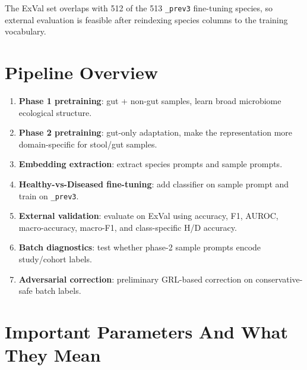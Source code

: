 \documentclass[11pt]{article}
\newcommand{\code}[1]{\texttt{\small #1}}
\begin{document}
The ExVal set overlaps with 512 of the 513 \code{\_prev3} fine-tuning species, so external
evaluation is feasible after reindexing species columns to the training vocabulary.

\section{Pipeline Overview}

\begin{enumerate}
  \item \textbf{Phase 1 pretraining}: gut + non-gut samples, learn broad microbiome
  ecological structure.
  \item \textbf{Phase 2 pretraining}: gut-only adaptation, make the representation more
  domain-specific for stool/gut samples.
  \item \textbf{Embedding extraction}: extract species prompts and sample prompts.
  \item \textbf{Healthy-vs-Diseased fine-tuning}: add classifier on sample prompt and train
  on \code{\_prev3}.
  \item \textbf{External validation}: evaluate on ExVal using accuracy, F1, AUROC,
  macro-accuracy, macro-F1, and class-specific H/D accuracy.
  \item \textbf{Batch diagnostics}: test whether phase-2 sample prompts encode
  study/cohort labels.
  \item \textbf{Adversarial correction}: preliminary GRL-based correction on
  conservative-safe batch labels.
\end{enumerate}

\section{Important Parameters And What They Mean}
\end{document}
